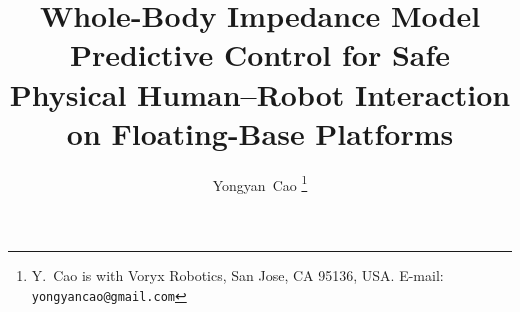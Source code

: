 \documentclass[journal]{IEEEtran}
\begin{document}
\title{Whole-Body Impedance Model Predictive Control for Safe
       Physical Human--Robot Interaction on Floating-Base Platforms}

\author{Yongyan~Cao%
  \thanks{Y.~Cao is with Voryx Robotics, San Jose, CA 95136, USA.
          E-mail: \texttt{yongyancao@gmail.com}}}

\maketitle


\end{document}
